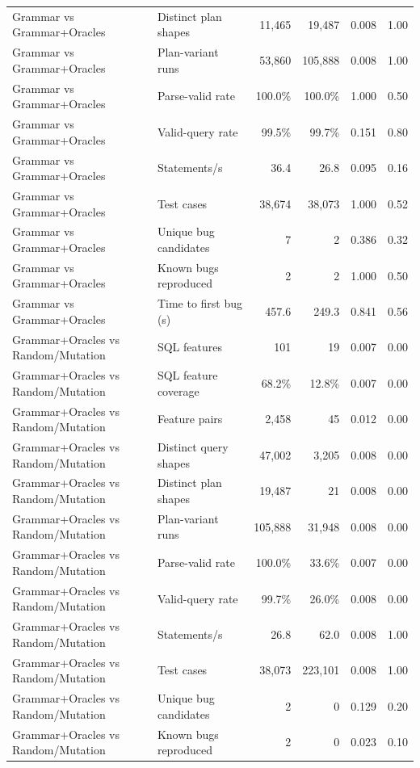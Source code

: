 \begin{table}[t]
\begin{tabular}{llrrrr}
    Grammar vs Grammar+Oracles & Distinct plan shapes & 11{,}465 & 19{,}487 & 0.008 & 1.00 \\
    Grammar vs Grammar+Oracles & Plan-variant runs & 53{,}860 & 105{,}888 & 0.008 & 1.00 \\
    Grammar vs Grammar+Oracles & Parse-valid rate & 100.0\% & 100.0\% & 1.000 & 0.50 \\
    Grammar vs Grammar+Oracles & Valid-query rate & 99.5\% & 99.7\% & 0.151 & 0.80 \\
    Grammar vs Grammar+Oracles & Statements/s & 36.4 & 26.8 & 0.095 & 0.16 \\
    Grammar vs Grammar+Oracles & Test cases & 38{,}674 & 38{,}073 & 1.000 & 0.52 \\
    Grammar vs Grammar+Oracles & Unique bug candidates & 7 & 2 & 0.386 & 0.32 \\
    Grammar vs Grammar+Oracles & Known bugs reproduced & 2 & 2 & 1.000 & 0.50 \\
    Grammar vs Grammar+Oracles & Time to first bug (s) & 457.6 & 249.3 & 0.841 & 0.56 \\
    Grammar+Oracles vs Random/Mutation & SQL features & 101 & 19 & 0.007 & 0.00 \\
    Grammar+Oracles vs Random/Mutation & SQL feature coverage & 68.2\% & 12.8\% & 0.007 & 0.00 \\
    Grammar+Oracles vs Random/Mutation & Feature pairs & 2{,}458 & 45 & 0.012 & 0.00 \\
    Grammar+Oracles vs Random/Mutation & Distinct query shapes & 47{,}002 & 3{,}205 & 0.008 & 0.00 \\
    Grammar+Oracles vs Random/Mutation & Distinct plan shapes & 19{,}487 & 21 & 0.008 & 0.00 \\
    Grammar+Oracles vs Random/Mutation & Plan-variant runs & 105{,}888 & 31{,}948 & 0.008 & 0.00 \\
    Grammar+Oracles vs Random/Mutation & Parse-valid rate & 100.0\% & 33.6\% & 0.007 & 0.00 \\
    Grammar+Oracles vs Random/Mutation & Valid-query rate & 99.7\% & 26.0\% & 0.008 & 0.00 \\
    Grammar+Oracles vs Random/Mutation & Statements/s & 26.8 & 62.0 & 0.008 & 1.00 \\
    Grammar+Oracles vs Random/Mutation & Test cases & 38{,}073 & 223{,}101 & 0.008 & 1.00 \\
    Grammar+Oracles vs Random/Mutation & Unique bug candidates & 2 & 0 & 0.129 & 0.20 \\
    Grammar+Oracles vs Random/Mutation & Known bugs reproduced & 2 & 0 & 0.023 & 0.10 \\

\end{tabular}
\end{table}
